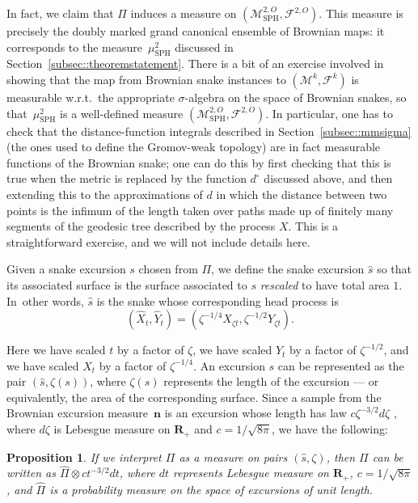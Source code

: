 \documentclass[JEP,XML,SOM,Unicode]{cedram}
\let\mathcal\mathscr
\let\oldS\S
\theoremstyle{plain}
\numberwithin{theorem}{section}
\newtheorem{proposition}[theorem]{Proposition}
\theoremstyle{definition}
\newcommand\gmsspace{{\mathcal M}_{\mathrm{SPH}}}
\newcommand\mmspace{{\mathcal M}}
\newcommand\mmsigma{{\mathcal F}}
\newcommand{\R}{\mathbf{R}}
\renewcommand{\S}{{\mathbf S}}
\newcommand{\excursion}{{\boldsymbol n}}
\newcommand{\mustwo}{\mu_{\mathrm{SPH}}^2}
\let\wh\widehat
\let\snakeexcursionmeasure \Pi
\begin{document}
In fact, we claim that $\snakeexcursionmeasure$ induces a measure on $(\gmsspace^{2,O},\mmsigma^{2,O})$. This measure is precisely the doubly marked grand canonical ensemble of Brownian maps: \ie it corresponds to the measure~$\mustwo$ discussed in Section~\ref{subsec::theoremstatement}. There is a bit of an exercise involved in showing that the map from Brownian snake instances to $(\mmspace^k, \mmsigma^k)$ is measurable w.r.t.\ the appropriate $\sigma$-algebra on the space of Brownian snakes, so that~$\mustwo$ is a well-defined measure $(\gmsspace^{2,O},\mmsigma^{2,O})$. In particular, one has to check that the distance-function integrals described in Section~\ref{subsec::mmsigma} (the ones used to define the Gromov-weak topology) are in fact measurable functions of the Brownian snake; one can do this by first checking that this is true when the metric is replaced by the function $d^\circ$ discussed above, and then extending this to the approximations of $d$ in which the distance between two points is the infimum of the length taken over paths made up of finitely many segments of the geodesic tree described by the process $X$. This is a straightforward exercise, and we will not include details here.

Given a snake excursion $s$ chosen from $\snakeexcursionmeasure$, we define the snake excursion $\wh s$ so that its associated surface is the surface associated to $s$ \emph{rescaled} to have total area $1$. In~other words, $\wh s$ is the snake whose corresponding head process is\vspace*{-3pt}
\[
(\wh X_t, \wh Y_t) = (\zeta^{-1/4} X_{ \zeta t}, \zeta^{-1/2} Y_{\zeta t}).
\]

Here we have scaled $t$ by a factor of $\zeta$, we have scaled $Y_t$ by a factor of $\zeta^{-1/2}$, and we have scaled $X_t$ by a factor of $\zeta^{-1/4}$. An excursion $s$ can be represented as the pair $(\wh s, \zeta(s))$, where $\zeta(s)$ represents the length of the excursion --- or equivalently, the area of the corresponding surface. Since a sample from the Brownian excursion measure~$\excursion$ is an excursion whose length has law $c \zeta^{-3/2} d\zeta$ \cite[Chap.\,XII, \oldS 4]{ry99martingales}, where $d\zeta$ is Lebesgue measure on $\R_+$ and $c=1/\sqrt{8\pi}$, we have the following:

\begin{proposition}
\label{prop::bm_measures}
If we interpret $\snakeexcursionmeasure$ as a measure on pairs $(\wh s, \zeta)$, then $\snakeexcursionmeasure$ can be written as $\wh \snakeexcursionmeasure \otimes c t^{-3/2} dt$, where $dt$ represents Lebesgue measure on $\R_+$, $c=1/\sqrt{8\pi}$, and $\wh \snakeexcursionmeasure$ is a probability measure on the space of excursions of unit length.
\end{proposition}
\end{document}
